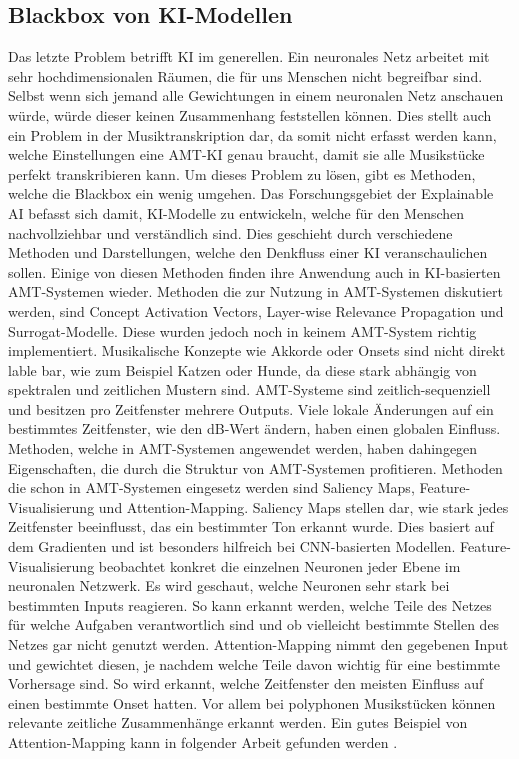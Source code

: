\subsection{Blackbox von KI-Modellen}
Das letzte Problem betrifft KI im generellen.
Ein neuronales Netz arbeitet mit sehr hochdimensionalen Räumen, die für uns Menschen nicht begreifbar sind.
Selbst wenn sich jemand alle Gewichtungen in einem neuronalen Netz anschauen würde,
würde dieser keinen Zusammenhang feststellen können.
Dies stellt auch ein Problem in der Musiktranskription dar, da somit nicht erfasst werden kann,
welche Einstellungen eine AMT-KI genau braucht,
damit sie alle Musikstücke perfekt transkribieren kann.
Um dieses Problem zu lösen, gibt es Methoden, welche die Blackbox ein wenig umgehen.
Das Forschungsgebiet der Explainable AI befasst sich damit,
KI-Modelle zu entwickeln, welche für den Menschen nachvollziehbar und verständlich sind.
Dies geschieht durch verschiedene Methoden und Darstellungen, welche den Denkfluss einer KI veranschaulichen sollen.
Einige von diesen Methoden finden ihre Anwendung auch in KI-basierten AMT-Systemen wieder.
Methoden die zur Nutzung in AMT-Systemen diskutiert werden, sind Concept Activation Vectors,
Layer-wise Relevance Propagation und Surrogat-Modelle.
Diese wurden jedoch noch in keinem AMT-System richtig implementiert.
Musikalische Konzepte wie Akkorde oder Onsets sind nicht direkt lable bar, wie zum Beispiel Katzen oder Hunde,
da diese stark abhängig von spektralen und zeitlichen Mustern sind.
AMT-Systeme sind zeitlich-sequenziell und besitzen pro Zeitfenster mehrere Outputs.
Viele lokale Änderungen auf ein bestimmtes Zeitfenster, wie den dB-Wert ändern, haben einen globalen Einfluss.
Methoden, welche in AMT-Systemen angewendet werden,
haben dahingegen Eigenschaften, die durch die Struktur von AMT-Systemen profitieren.
Methoden die schon in AMT-Systemen eingesetz werden sind Saliency Maps, Feature-Visualisierung und Attention-Mapping.
Saliency Maps stellen dar, wie stark jedes Zeitfenster beeinflusst, das ein bestimmter Ton erkannt wurde.
Dies basiert auf dem Gradienten und ist besonders hilfreich bei CNN-basierten Modellen.
Feature-Visualisierung beobachtet konkret die einzelnen Neuronen jeder Ebene im neuronalen Netzwerk.
Es wird geschaut, welche Neuronen sehr stark bei bestimmten Inputs reagieren.
So kann erkannt werden, welche Teile des Netzes für welche Aufgaben verantwortlich sind
und ob vielleicht bestimmte Stellen des Netzes gar nicht genutzt werden.
Attention-Mapping nimmt den gegebenen Input und gewichtet diesen,
je nachdem welche Teile davon wichtig für eine bestimmte Vorhersage sind.
So wird erkannt, welche Zeitfenster den meisten Einfluss auf einen bestimmte Onset hatten.
Vor allem bei polyphonen Musikstücken können relevante zeitliche Zusammenhänge erkannt werden.
Ein gutes Beispiel von Attention-Mapping kann in folgender Arbeit gefunden werden .
